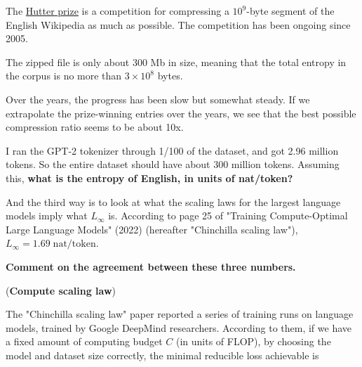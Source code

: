 \begin{enumerate}
    The \href{http://prize.hutter1.net/}{Hutter prize} is a competition for compressing a $10^9$-byte segment of the English Wikipedia as much as possible. The competition has been ongoing since 2005. 

    The zipped file is only about 300 Mb in size, meaning that the total entropy in the corpus is no more than $3\times 10^8$ bytes.
    
    Over the years, the progress has been slow but somewhat steady. If we extrapolate the prize-winning entries over the years, we see that the best possible compression ratio seems to be about 10x.
    
    I ran the GPT-2 tokenizer through 1/100 of the dataset, and got 2.96 million tokens. So the entire dataset should have about 300 million tokens. Assuming this, \textbf{what is the entropy of English, in units of nat/token?}


    And the third way is to look at what the scaling laws for the largest language models imply what $L_\infty$ is. According to page 25 of "Training Compute-Optimal Large Language Models" (2022) (hereafter "Chinchilla scaling law"), $L_\infty = 1.69\;\mathrm{nat/token}$.

    \textbf{Comment on the agreement between these three numbers.}


    \qitem (\textbf{Compute scaling law})

    The "Chinchilla scaling law" paper reported a series of training runs on language models, trained by Google DeepMind researchers. According to them, if we have a fixed amount of computing budget $C$ (in units of FLOP), by choosing the model and dataset size correctly, the minimal reducible loss achievable is


\end{enumerate}
